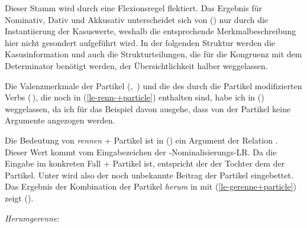 \noindent
Dieser Stamm wird durch eine Flexionsregel flektiert. Das Ergebnis 
für Nominativ, Dativ und Akkusativ unterscheidet
sich von () nur durch die Instantiierung der Kasuswerte, weshalb
die entsprechende Merkmalbeschreibung hier nicht gesondert aufgeführt wird.
In der folgenden Struktur werden die Kasusinformation und auch die Strukturteilungen,
die für die Kongruenz mit dem Determinator benötigt werden, der Übersichtlichkeit
halber weggelassen.

Die Valenzmerkmale der Partikel (\subj {}, \comps {}\,) und die \argst des durch die
Partikel modifizierten Verbs (\argst {}\,), die noch in (\ref{le-renn-+particle}) enthalten sind, habe ich
in () weggelassen, da ich für das Beispiel davon ausgehe, dass von der Partikel keine
Argumente angezogen werden.

Die Bedeutung von \emph{rennen} + Partikel ist in () ein Argument der
Relation  . Dieser Wert kommt vom Eingabezeichen der
\gee-Nominalisierungs-LR. Da die Eingabe im konkreten Fall  + Partikel ist, entspricht der
\contw der Tochter dem \contw der Partikel. Unter  wird also der
noch unbekannte Beitrag der Partikel eingebettet. Das Ergebnis der Kombination der Partikel \emph{herum} in 
mit (\ref{le-gerenne+particle}) zeigt ().

\eas
\label{fs-Herumgerenne}%
\emph{Herumgerenne}:\\
\zs

